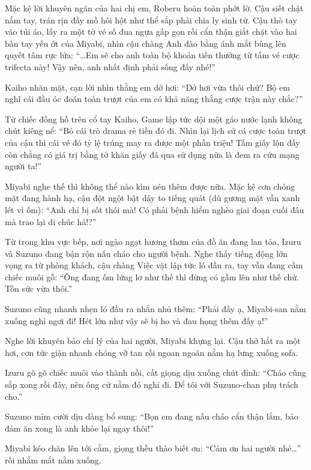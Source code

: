 \documentclass[../main.tex]{subfiles}
\begin{document}
Mặc kệ lời khuyên ngăn của hai chị em, Roberu hoàn toàn phớt lờ. Cậu siết chặt nắm tay, trán rịn đầy mồ hôi hột như thể sắp phải chia ly sinh tử. Cậu thò tay vào túi áo, lấy ra một tờ vé số đua ngựa gấp gọn rồi cẩn thận giắt chặt vào hai bàn tay yếu ớt của Miyabi, nhìn cậu chàng Anh đào bằng ánh mắt bùng lên quyết tâm rực lửa: ``\dots Em sẽ cho anh toàn bộ khoản tiền thưởng từ tấm vé cược trifecta này! Vậy nên, anh nhất định phải sống đấy nhé!''


Kaiho nhăn mặt, cạn lời nhìn thằng em dở hơi: ``Dở hơi vừa thôi chứ? Bộ em nghĩ cái đầu óc đoán toàn trượt của em có khả năng thắng cược trận này chắc?''

Từ chiếc đồng hồ trên cổ tay Kaiho, Game lập tức dội một gáo nước lạnh không chút kiêng nể: ``Bỏ cái trò drama rẻ tiền đó đi. Nhìn lại lịch sử cá cược toàn trượt của cậu thì cái vé đó tỷ lệ trúng may ra được một phần triệu! Tấm giấy lộn đấy còn chẳng có giá trị bằng tờ khăn giấy đã qua sử dụng nữa là đem ra cứu mạng người ta!''

Miyabi nghe thế thì không thể nào kìm nén thêm được nữa. Mặc kệ cơn chóng mặt đang hành hạ, cậu đột ngột bật dậy to tiếng quát (dù gương mặt vẫn xanh lét vì ốm): ``Anh chỉ bị sốt thôi mà! Có phải bệnh hiểm nghèo giai đoạn cuối đâu mà trao lại di chúc hả!?''

Từ trong khu vực bếp, nơi ngào ngạt hương thơm của đồ ăn đang lan tỏa, Izuru và Suzuno đang bận rộn nấu cháo cho người bệnh. Nghe thấy tiếng động lớn vọng ra từ phòng khách, cậu chàng Việc vặt lập tức ló đầu ra, tay vẫn đang cầm chiếc muôi gỗ: ``Ông đang ốm lửng lơ như thế thì đừng có gầm lên như thế chứ. Tốn sức vừa thôi.''


Suzuno cũng nhanh nhẹn ló đầu ra nhắn nhủ thêm: ``Phải đấy ạ, Miyabi-san nằm xuống nghỉ ngơi đi! Hét lớn như vậy sẽ bị ho và đau họng thêm đấy ạ!''

Nghe lời khuyên bảo chí lý của hai người, Miyabi khựng lại. Cậu thở hắt ra một hơi, cơn tức giận nhanh chóng vỡ tan rồi ngoan ngoãn nằm hạ lưng xuống sofa.

Izuru gõ gõ chiếc muôi vào thành nồi, cất giọng dịu xuống chút đỉnh: ``Cháo cũng sắp xong rồi đây, nên ông cứ nằm đó nghỉ đi. Để tôi với Suzuno-chan phụ trách cho.''

Suzuno mỉm cười dịu dàng bổ sung: ``Bọn em đang nấu cháo cẩn thận lắm, bảo đảm ăn xong là anh khỏe lại ngay thôi!''

Miyabi kéo chăn lên tới cằm, giọng thều thào biết ơn: ``Cảm ơn hai người nhé\dots'' rồi nhắm mắt nằm xuống.
\end{document}

